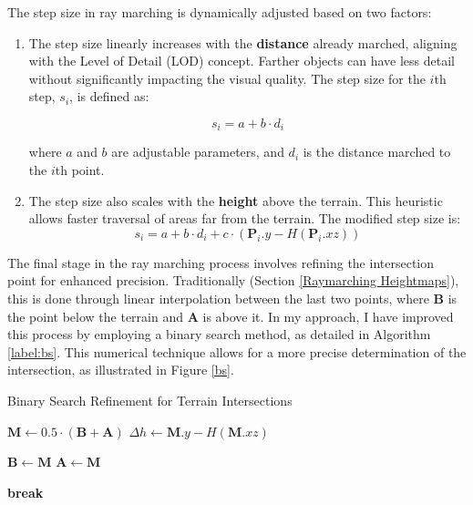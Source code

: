 The step size in ray marching is dynamically adjusted based on two factors:

\begin{enumerate}
    \item The step size linearly increases with the \textbf{distance} already marched, aligning with the Level of Detail (LOD) concept. Farther objects can have less detail without significantly impacting the visual quality. The step size for the $i$th step, $s_i$, is defined as:

   \begin{equation}
   s_{i} = a + b \cdot d_i
   \end{equation}
   
   where $a$ and $b$ are adjustable parameters, and $d_i$ is the distance marched to the $i$th point.

    \item The step size also scales with the \textbf{height} above the terrain. This heuristic allows faster traversal of areas far from the terrain. The modified step size is:
    \begin{equation}
    s_{i} = a + b \cdot d_{i} + c \cdot (\mathbf{P}_i.y - H(\mathbf{P}_i.xz))
    \end{equation}

\end{enumerate}

The final stage in the ray marching process involves refining the intersection point for enhanced precision. Traditionally (Section \ref{Raymarching Heightmaps}), this is done through linear interpolation between the last two points, where  $\mathbf{B}$ is the point below the terrain and $\mathbf{A}$ is above it. In my approach, I have improved this process by employing a binary search method, as detailed in Algorithm \ref{label:bs}. This numerical technique allows for a more precise determination of the intersection, as illustrated in Figure \ref{bs}.

\begin{algorithm}
\caption{Binary Search Refinement for Terrain Intersections}
\label{label:bs}
\begin{algorithmic}
        \State $\mathbf{M} \gets 0.5 \cdot (\mathbf{B} + \mathbf{A})$
        \State $\Delta h \gets \mathbf{M}.y - H(\mathbf{M}.xz)$

            \State $\mathbf{B} \gets \mathbf{M}$
        \Else
            \State $\mathbf{A} \gets \mathbf{M}$
        \EndIf

            \State \textbf{break}
        \EndIf
    \EndFor
\EndFunction
\end{algorithmic}
\end{algorithm}

